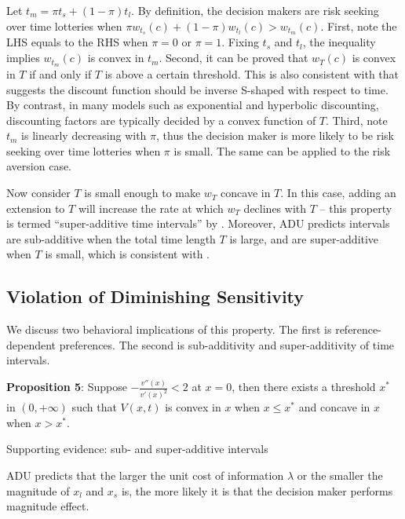 \documentclass[
  12pt,
]{article}
\begin{document}
Let \(t_m = \pi t_s +(1-\pi) t_l\). By definition, the decision makers
are risk seeking over time lotteries when
\(\pi w_{t_s}(c)+(1-\pi)w_{t_l}(c)>w_{t_m}(c)\). First, note the LHS
equals to the RHS when \(\pi=0\) or \(\pi=1\). Fixing \(t_s\) and
\(t_l\), the inequality implies \(w_{t_m}(c)\) is convex in \(t_m\).
Second, it can be proved that \(w_T(c)\) is convex in \(T\) if and only
if \(T\) is above a certain threshold. This is also consistent with
\citet{takeuchi_non-parametric_2011} that suggests the discount function
should be inverse S-shaped with respect to time. By contrast, in many
models such as exponential and hyperbolic discounting, discounting
factors are typically decided by a convex function of \(T\). Third, note
\(t_m\) is linearly decreasing with \(\pi\), thus the decision maker is
more likely to be risk seeking over time lotteries when \(\pi\) is
small. The same can be applied to the risk aversion case.

Now consider \(T\) is small enough to make \(w_T\) concave in \(T\). In
this case, adding an extension to \(T\) will increase the rate at which
\(w_T\) declines with \(T\) -- this property is termed ``super-additive
time intervals'' by \citet{read_is_2001}. Moreover, ADU predicts
intervals are sub-additive when the total time length \(T\) is large,
and are super-additive when \(T\) is small, which is consistent with
\citet{scholten_discounting_2006}.

\hypertarget{violation-of-diminishing-sensitivity}{%
\subsection{Violation of Diminishing
Sensitivity}\label{violation-of-diminishing-sensitivity}}

We discuss two behavioral implications of this property. The first is
reference-dependent preferences. The second is sub-additivity and
super-additivity of time intervals.

\textbf{Proposition 5}: Suppose \(-\frac{v''(x)}{v'(x)^2}<2\) at
\(x=0\), then there exists a threshold \(x^*\) in \((0,+\infty)\) such
that \(V(x,t)\) is convex in \(x\) when \(x\leq x^*\) and concave in
\(x\) when \(x>x^*\).

Supporting evidence: sub- and super-additive intervals

ADU predicts that the larger the unit cost of information \(\lambda\) or
the smaller the magnitude of \(x_l\) and \(x_s\) is, the more likely it
is that the decision maker performs magnitude effect.
\end{document}
